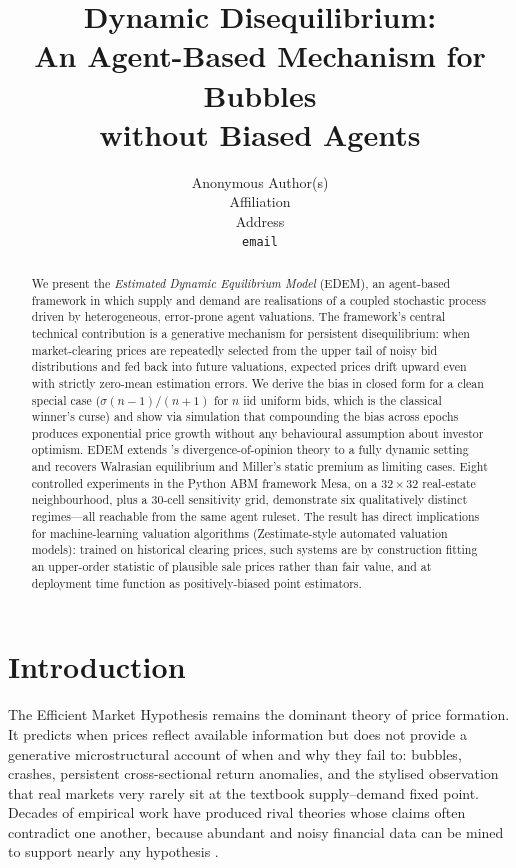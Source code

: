 \documentclass{article}
\title{Dynamic Disequilibrium:\\
       An Agent-Based Mechanism for Bubbles\\
       without Biased Agents}
\author{%
  Anonymous Author(s)\\
  Affiliation\\
  Address\\
  \texttt{email}\\
}
\begin{document}
\maketitle

\begin{abstract}
We present the \emph{Estimated Dynamic Equilibrium Model} (EDEM), an
agent-based framework in which supply and demand are realisations of
a coupled stochastic process driven by heterogeneous, error-prone
agent valuations. The framework's central technical contribution is
a generative mechanism for persistent disequilibrium: when
market-clearing prices are repeatedly selected from the upper tail of
noisy bid distributions and fed back into future valuations, expected
prices drift upward even with strictly zero-mean estimation errors.
We derive the bias in closed form for a clean special case
($\sigma(n-1)/(n+1)$ for $n$ iid uniform bids, which is the
classical winner's curse) and show via simulation that compounding
the bias across epochs produces exponential price growth without any
behavioural assumption about investor optimism. EDEM extends
\citet{miller1977}'s divergence-of-opinion theory to a fully dynamic
setting and recovers Walrasian equilibrium and Miller's static
premium as limiting cases. Eight controlled experiments in the
Python ABM framework Mesa, on a $32 \times 32$ real-estate
neighbourhood, plus a 30-cell sensitivity grid, demonstrate six
qualitatively distinct regimes---all reachable from the same agent
ruleset. The result has direct implications for machine-learning
valuation algorithms (Zestimate-style automated valuation models):
trained on historical clearing prices, such systems are by
construction fitting an upper-order statistic of plausible sale
prices rather than fair value, and at deployment time function as
positively-biased point estimators.
\end{abstract}

\section{Introduction}
\label{sec:intro}

The Efficient Market Hypothesis remains the dominant theory of price
formation. It predicts when prices reflect available information but
does not provide a generative microstructural account of when and
why they fail to: bubbles, crashes, persistent cross-sectional
return anomalies, and the stylised observation that real markets
very rarely sit at the textbook supply--demand fixed point. Decades
of empirical work have produced rival theories whose claims often
contradict one another, because abundant and noisy financial data
can be mined to support nearly any hypothesis \citep{moffitt2017}.
\end{document}

